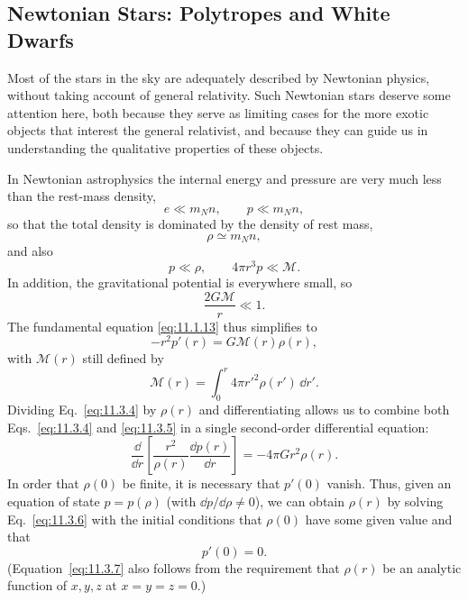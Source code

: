 
\subsection{Newtonian Stars: Polytropes and White Dwarfs}\label{sec:11.3}

Most of the stars in the sky are adequately described by Newtonian physics,
without taking account of general relativity. Such Newtonian stars deserve
some attention here, both because they serve as limiting cases for the more
exotic objects that interest the general relativist, and because they can
guide us in understanding the qualitative properties of these objects.

In Newtonian astrophysics the internal energy and pressure are very much less
than the rest-mass density,
\begin{equation}
  e\ll m_Nn,\qquad p\ll m_Nn,
  \tag{11.3.1}\label{eq:11.3.1}
\end{equation}
so that the total density is dominated by the density of rest mass,
\begin{equation}
  \rho\simeq m_Nn,
  \tag{11.3.2}\label{eq:11.3.2}
\end{equation}
and also
\[
  p\ll\rho,\qquad 4\pi r^3p\ll\mathcal{M}.
\]
In addition, the gravitational potential is everywhere small, so
\begin{equation}
  \frac{2G\mathcal{M}}r\ll1.
  \tag{11.3.3}\label{eq:11.3.3}
\end{equation}
The fundamental equation \eqref{eq:11.1.13} thus simplifies to
\begin{equation}
  -r^2p'(r)=G\mathcal{M}(r)\rho(r),
  \tag{11.3.4}\label{eq:11.3.4}
\end{equation}
with \(\mathcal{M}(r)\) still defined by
\begin{equation}
  \mathcal{M}(r)=\int_0^r4\pi r'^2\rho(r')\,\dd r'.
  \tag{11.3.5}\label{eq:11.3.5}
\end{equation}
Dividing Eq.~\eqref{eq:11.3.4} by \(\rho(r)\) and differentiating allows us
to combine both Eqs.~\eqref{eq:11.3.4} and \eqref{eq:11.3.5} in a single
second-order differential equation:
\begin{equation}
  \frac{\dd}{\dd r}
  \left[
    \frac{r^2}{\rho(r)}\frac{\dd p(r)}{\dd r}
  \right]
  =-4\pi Gr^2\rho(r).
  \tag{11.3.6}\label{eq:11.3.6}
\end{equation}
In order that \(\rho(0)\) be finite, it is necessary that \(p'(0)\) vanish.
Thus, given an equation of state \(p=p(\rho)\) (with \(\dd p/\dd\rho\ne0\)), we can
obtain \(\rho(r)\) by solving Eq.~\eqref{eq:11.3.6} with the initial
conditions that \(\rho(0)\) have some given value and that
\begin{equation}
  p'(0)=0.
  \tag{11.3.7}\label{eq:11.3.7}
\end{equation}
(Equation~\eqref{eq:11.3.7} also follows from the requirement that
\(\rho(r)\) be an analytic function of \(x,y,z\) at \(x=y=z=0\).)


